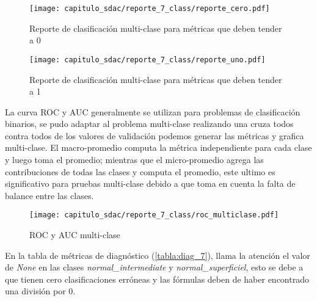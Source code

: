 \begin{figure}[H]
    \centering
    \texttt{[image: capitulo\_sdac/reporte\_7\_class/reporte\_cero.pdf]}
    \caption{Reporte de clasificación multi-clase para métricas que deben tender a 0}\label{fig:reporte_7_0}
\end{figure}

\begin{figure}[H]
    \centering
    \texttt{[image: capitulo\_sdac/reporte\_7\_class/reporte\_uno.pdf]}
    \caption{Reporte de clasificación multi-clase para métricas que deben tender a 1}\label{fig:reporte_7_1}
\end{figure}

La curva ROC y AUC generalmente se utilizan para problemas de clasificación
binarios, se pudo adaptar al problema multi-clase  realizando una cruza todos
contra todos de los valores de validación podemos generar las métricas y grafica
multi-clase. El macro-promedio computa la métrica independiente para cada clase
y luego toma el promedio; mientras que el micro-promedio agrega las
contribuciones de todas las clases y computa el promedio, este ultimo es
significativo para pruebas multi-clase debido a que toma en cuenta la falta de
balance entre las clases.

\begin{figure}[H]
    \centering
    \texttt{[image: capitulo\_sdac/reporte\_7\_class/roc\_multiclase.pdf]}
    \caption{ROC y AUC multi-clase} 
    \label{fig:matriz_norm_7}
\end{figure} 

En la tabla de métricas de diagnóstico (\autoref{tabla:diag_7}), llama la
atención el valor de \emph{None} en las clases \emph{normal\_intermediate} y
\emph{normal\_superficiel}, esto se debe a que tienen cero clasificaciones
erróneas y las fórmulas deben de haber encontrado una división por 0. 

